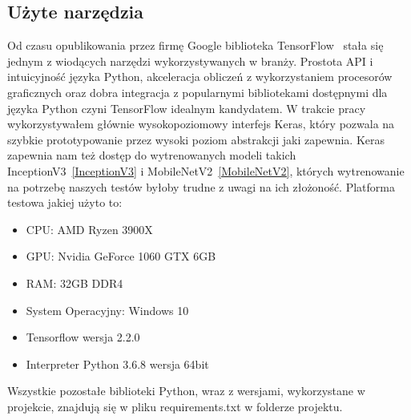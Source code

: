 \documentclass[
    left=2.5cm,         %
    right=2.5cm,        %
    top=2.5cm,          %
    bottom=3cm,         %
    bindingoffset=6mm,  %
    nohyphenation=false %
]{eiti/eiti-thesis}
\begin{document}
\subsection{Użyte narzędzia}
Od czasu opublikowania przez firmę Google biblioteka TensorFlow~\cite{DBLP:journals/corr/AbadiABBCCCDDDG16}
stała się jednym z wiodących narzędzi wykorzystywanych w branży. Prostota API i intuicyjność
języka Python, akceleracja obliczeń z wykorzystaniem procesorów graficznych oraz dobra integracja z
popularnymi bibliotekami dostępnymi dla języka Python czyni TensorFlow idealnym kandydatem.
W trakcie pracy wykorzystywałem głównie wysokopoziomowy interfejs Keras, który pozwala na szybkie
prototypowanie przez wysoki poziom abstrakcji jaki zapewnia. Keras zapewnia nam też dostęp do wytrenowanych modeli takich
InceptionV3~\ref{InceptionV3} i MobileNetV2~\ref{MobileNetV2}, których wytrenowanie na potrzebę naszych testów byłoby
trudne z uwagi na ich złożoność.
Platforma testowa jakiej użyto to:
\begin{itemize}
    \item CPU: AMD Ryzen 3900X
    \item GPU: Nvidia GeForce 1060 GTX 6GB
    \item RAM: 32GB DDR4
    \item System Operacyjny: Windows 10
    \item Tensorflow wersja 2.2.0
    \item Interpreter Python 3.6.8 wersja 64bit
\end{itemize}
Wszystkie pozostałe biblioteki Python, wraz z wersjami, wykorzystane w projekcie, znajdują się w pliku
requirements.txt w folderze projektu.

\newpage
\end{document}
